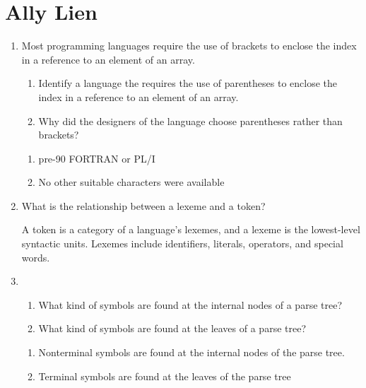 
\chapter{Ally Lien}

\begin{enumerate}
  \item Most programming languages require the use of brackets to
    enclose the index in a reference to an element of an array.
  \begin{enumerate}
    \item Identify a language the requires the use of parentheses
      to enclose the index in a reference to an element of an array.
    \item Why did the designers of the language choose parentheses
      rather than brackets?
    \end{enumerate}

  \begin{answer}

  \begin{enumerate}
    \item pre-90 FORTRAN or PL/I
    \item No other suitable characters were available
    \end{enumerate}

    \end{answer}
    
  \item What is the relationship between a lexeme and a token?

  \begin{answer}

    A token is a category of a language's lexemes, and a lexeme is
    the lowest-level syntactic units. Lexemes include identifiers, 
    literals, operators, and special words.

    \end{answer}

  \item
  \begin{enumerate}
    \item What kind of symbols are found at the internal nodes of a
      parse tree?
    \item What kind of symbols are found at the leaves of a parse tree?
    \end{enumerate}

  \begin{answer}

  \begin{enumerate}
    \item Nonterminal symbols are found at the internal nodes of the
	parse tree.
    \item Terminal symbols are found at the leaves of the parse tree
    \end{enumerate}


\end{answer}
\end{enumerate}
